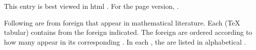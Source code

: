 \documentclass[12pt]{article}
\begin{document}

This entry is best viewed in html .  For the page  version, .

Following are  from foreign  that appear in mathematical literature.  Each  (TeX  tabular) contains  from the foreign  indicated.  The foreign  are ordered according to how many  appear in its corresponding .  In each , the  are listed in alphabetical .
\end{document}

